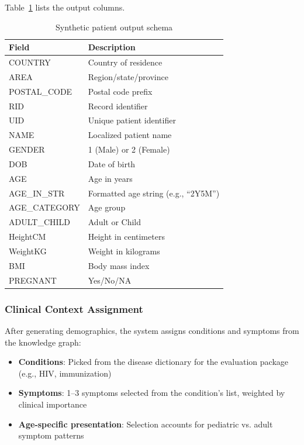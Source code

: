 Table~\ref{tab:patient_schema} lists the output columns.
\begin{table}[h]
\centering
\begin{tabular}{ll}
\hline
\textbf{Field} & \textbf{Description} \\
\hline
COUNTRY & Country of residence \\
AREA & Region/state/province \\
POSTAL\_CODE & Postal code prefix \\
RID & Record identifier \\
UID & Unique patient identifier \\
NAME & Localized patient name \\
GENDER & 1 (Male) or 2 (Female) \\
DOB & Date of birth \\
AGE & Age in years \\
AGE\_IN\_STR & Formatted age string (e.g., ``2Y5M'') \\
AGE\_CATEGORY & Age group \\
ADULT\_CHILD & Adult or Child \\
HeightCM & Height in centimeters \\
WeightKG & Weight in kilograms \\
BMI & Body mass index \\
PREGNANT & Yes/No/NA \\
\hline
\end{tabular}
\caption{Synthetic patient output schema}
\label{tab:patient_schema}
\end{table}

\subsubsection{Clinical Context Assignment}

After generating demographics, the system assigns conditions and symptoms from the knowledge graph:
\begin{itemize}
    \item \textbf{Conditions}: Picked from the disease dictionary for the evaluation package (e.g., HIV, immunization)
    \item \textbf{Symptoms}: 1--3 symptoms selected from the condition's list, weighted by clinical importance
    \item \textbf{Age-specific presentation}: Selection accounts for pediatric vs. adult symptom patterns
\end{itemize}
